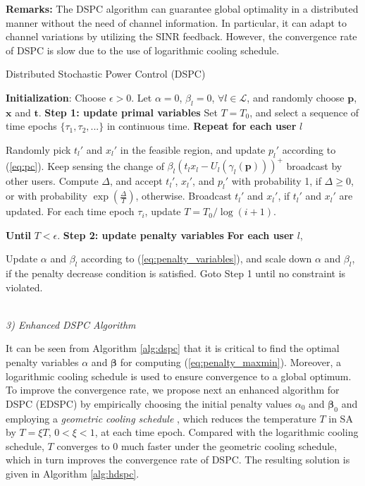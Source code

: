 \documentclass[10pt,journal,letterpaper,compsoc]{IEEEtran}
\begin{document}
{{{\bf Remarks:} The DSPC algorithm can guarantee global optimality in a distributed manner without the need of channel information. In particular, it can adapt to channel variations by utilizing the SINR feedback. However, the convergence rate of DSPC is slow due to the use of logarithmic cooling schedule.



\begin{algorithm}
\caption{Distributed Stochastic Power Control (DSPC)}
\label{alg:dspc}
\begin{algorithmic}
\STATE \textbf{Initialization}: Choose $\epsilon>0$. Let $\alpha=0$, $\beta_l=0$, $\forall l\in\mathcal{L}$, and randomly choose $\mathbf{p}$, $\mathbf{x}$ and $\mathbf{t}$.
\STATE \textbf{Step 1: update primal variables}
\STATE Set $T=T_0$, and select a sequence of time epochs $\{\tau_1,\tau_2,... \}$ in continuous time.
\STATE \quad \textbf{Repeat for each user} $l$
\begin{enumerate}
\STATE Randomly pick $t_l'$ and $x_l'$ in the feasible region, and update $p_l'$ according to (\ref{eq:pc}).
\STATE Keep sensing the change of $\beta_l(t_lx_l- U_l(\gamma_l(\mathbf{p})))^{+}$ broadcast by other users.
\STATE Compute $\Delta$, and accept $t_l'$, $x_l'$, and $p_l'$ with probability 1, if $\Delta\ge 0$, or with probability $\exp(\frac{\Delta}{T})$, otherwise.
\STATE Broadcast $t_l'$ and $x_l'$, if $t_l'$ and $x_l'$ are updated.
\STATE For each time epoch $\tau_i$, update $T=T_0/\log(i+1)$.
\end{enumerate}
\STATE \quad \textbf{Until} $T<\epsilon$.
\STATE \textbf{Step 2: update penalty variables}
\STATE \quad \textbf{For each user} $l$,
\begin{enumerate}
\STATE Update $\alpha$ and $\beta_l$ according to (\ref{eq:penalty_variables}), and scale down $\alpha$ and $\beta_l$, if the penalty decrease condition is satisfied.
\STATE Goto Step 1 until no constraint is violated.
\end{enumerate}
\end{algorithmic}
\end{algorithm}

\noindent
\\
\emph{3) Enhanced DSPC Algorithm}

It can be seen from Algorithm \ref{alg:dspc} that it is critical to find the optimal penalty variables $\alpha$ and $\boldsymbol{\beta}$ for computing (\ref{eq:penalty_maxmin}). Moreover, a logarithmic cooling schedule is used to ensure convergence to a global optimum. To improve the convergence rate, we propose next an enhanced algorithm for DSPC (EDSPC) by empirically choosing the initial penalty values $\alpha_0$ and $\boldsymbol{\beta}_0$ and employing a \emph{geometric cooling schedule} \cite{Kirkpatrick:1983}, which reduces the temperature $T$ in SA by $T=\xi T$, $0<\xi<1$, at each time epoch. Compared with the logarithmic cooling schedule, $T$ converges to 0 much faster under the geometric cooling schedule, which in turn improves the convergence rate of DSPC. The resulting solution is given in Algorithm \ref{alg:hdspc}.

}}
\end{document}
